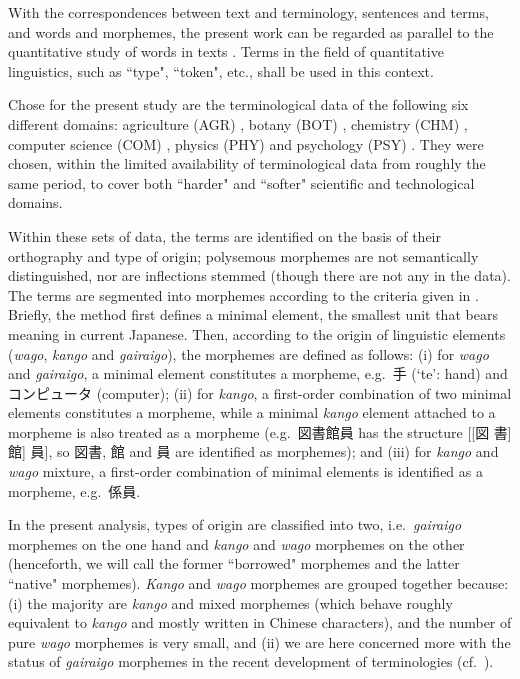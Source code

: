 With the correspondences between text and terminology, sentences and
terms, and words and morphemes, the present work can be regarded as
parallel to the quantitative study of words in texts
\cite{zipf35,yule44,mandelbrot53,simon55,carrol67,sichel75}.
Terms in the field of quantitative linguistics, such as ``type", ``token",
etc., shall be used in this context.

Chose for the present study are the terminological data of the following six 
different domains: agriculture (AGR) \cite{agrterm}, botany
(BOT) \cite{botterm}, chemistry (CHM) \cite{chmterm}, computer science
(COM) \cite{aiso}, physics (PHY) \cite{phyterm} and psychology (PSY)
\cite{psyterm}. They were chosen, within the limited availability
of terminological data from roughly the same period, to cover both
``harder" and ``softer" scientific and technological domains.

Within these sets of data, the terms are identified on the basis of their
orthography and type of origin; polysemous morphemes are not 
semantically distinguished, nor are inflections stemmed (though there 
are not any in the data). The terms
are segmented into morphemes according to the criteria given in \cite{nomura89}.
Briefly, the method first defines a minimal element, the smallest unit that 
bears meaning in current Japanese. Then, according to the origin of
linguistic elements ({\it wago}, {\it kango} and {\it gairaigo}), the morphemes are defined
as follows: (i) for {\it wago} and {\it gairaigo}, a minimal element constitutes a
morpheme, e.g.\ 手 (`te': hand) and コンピュータ (computer); (ii) for
{\it kango}, a first-order combination of two minimal elements constitutes
a morpheme, while a minimal {\it kango} element attached to a morpheme is
also treated as a morpheme (e.g.\ 図書館員 has the structure [[図 書] 館] 員],
so 図書, 館 and 員 are identified as morphemes); and (iii) for
{\it kango} and {\it wago} mixture, a first-order combination of minimal
elements is identified as a morpheme, e.g.\ 係員.

In the present analysis, types of origin are classified into two, i.e.\ {\it gairaigo} 
morphemes on the one hand and {\it kango} and {\it wago} morphemes on the other
(henceforth, we will call the former ``borrowed" morphemes and the latter
``native" morphemes). {\it Kango} and {\it wago} morphemes are grouped together 
because: (i) the majority are {\it kango} and mixed morphemes (which behave roughly 
equivalent to {\it kango} and mostly written in Chinese characters), and the 
number of pure {\it wago} morphemes is very small, and (ii) we are here concerned 
more with the status of {\it gairaigo} morphemes in the recent development of 
terminologies (cf.\ \cite{ishii87}).


